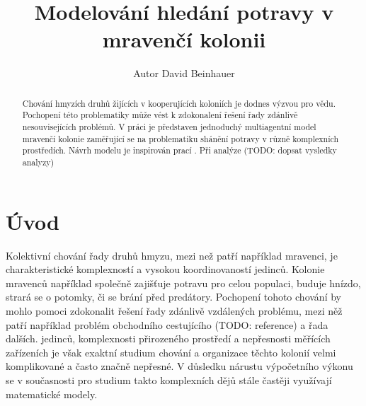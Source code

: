 \documentclass[10pt,a4paper,twocolumn]{article}
\begin{document}
\providecommand{\ShortAuthorList}[0]{A.~M.~Surname, B.~D.~Suffix Jr., C.~G. Suffix III} %
\title{Modelování hledání potravy v mravenčí kolonii}
\author[1]{Autor David Beinhauer}

\date{\dateline{}}

\begin{abstract}
\noindent
Chování hmyzích druhů žijících v kooperujících koloniích je dodnes 
výzvou pro vědu. Pochopení této problematiky může vést k zdokonalení řešení
řady zdánlivě nesouvisejících problémů. V práci je představen jednoduchý
multiagentní model mravenčí kolonie zaměřující se na problematiku shánění
potravy v různě komplexních prostředích. Návrh modelu je inspirován prací 
\citet{jones2010characteristics}. 
Při analýze (TODO: dopsat vysledky analyzy)


\DOI{} %
\end{abstract}

\maketitle
\thispagestyle{titlestyle}



\section{Úvod}

Kolektivní chování řady druhů hmyzu, mezi než patří například mravenci,
je charakteristické komplexností a vysokou koordinovaností jedinců. Kolonie
mravenců například společně zajišťuje potravu pro celou populaci, buduje hnízdo,
strará se o potomky, či se brání před predátory. Pochopení tohoto chování by
mohlo pomoci zdokonalit řešení řady zdánlivě vzdálených problému, mezi něž
patří například problém obchodního cestujícího (TODO: reference) a řada dalších. 
jedinců, komplexnosti přirozeného prostředí a nepřesnosti měřících zařízeních 
je však exaktní studium chování a organizace těchto kolonií velmi komplikované a 
často značně nepřesné. V důsledku nárustu výpočetního výkonu se v současnosti 
pro studium takto komplexních dějů stále častěji využívají matematické modely. 
\end{document}
